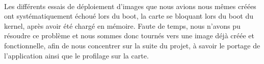 \paragraph{}
Les différents essais de déploiement d'images que nous avions nous mêmes créées
ont systématiquement échoué lors du boot, la carte se bloquant lors du boot
du kernel, après avoir été chargé en mémoire. Faute de temps, nous n'avons pu
résoudre ce problème et nous sommes donc tournés vers une image déjà créée et
fonctionnelle, afin de nous concentrer sur la suite du projet, à savoir le
portage de l'application ainsi que le profilage sur la carte.
